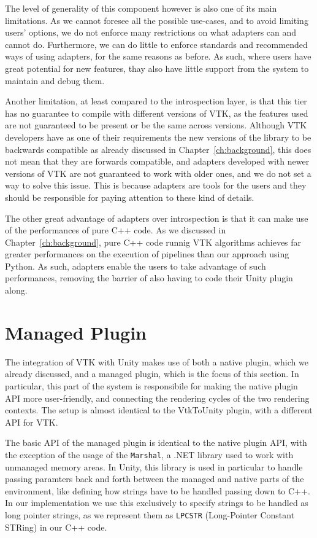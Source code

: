 The level of generality of this component however is also one of its main limitations. As we cannot foresee all the possible use-cases, and to avoid limiting users' options, we do not enforce many restrictions on what adapters can and cannot do. Furthermore, we can do little to enforce standards and recommended ways of using adapters, for the same reasons as before. As such, where users have great potential for new features, thay also have little support from the system to maintain and debug them.

Another limitation, at least compared to the introspection layer, is that this tier has no guarantee to compile with different versions of VTK, as the features used are not guaranteed to be present or be the same across versions. Although VTK developers have as one of their requirements the new versions of the library to be backwards compatible as already discussed in Chapter~\ref{ch:background}, this does not mean that they are forwards compatible, and adapters developed with newer versions of VTK are not guaranteed to work with older ones, and we do not set a way to solve this issue. This is because adapters are tools for the users and they should be responsible for paying attention to these kind of details.

The other great advantage of adapters over introspection is that it can make use of the performances of pure C++ code. As we discussed in Chapter~\ref{ch:background}, pure C++ code runnig VTK algorithms achieves far greater performances on the execution of pipelines than our approach using Python. As such, adapters enable the users to take advantage of such performances, removing the barrier of also having to code their Unity plugin along.

\section{Managed Plugin}
\label{sec:design-managed-plugin}

The integration of VTK with Unity makes use of both a native plugin, which we already discussed, and a managed plugin, which is the focus of this section. In particular, this part of the system is responsibile for making the native plugin API more user-friendly, and connecting the rendering cycles of the two rendering contexts. The setup is almost identical to the VtkToUnity plugin, with a different API for VTK.

The basic API of the managed plugin is identical to the native plugin API, with the exception of the usage of the \verb|Marshal|, a .NET library used to work with unmanaged memory areas. In Unity, this library is used in particular to handle passing paramters back and forth between the managed and native parts of the environment, like defining how strings have to be handled passing down to C++. In our implementation we use this exclusively to specify strings to be handled as long pointer strings, as we represent them as \verb|LPCSTR| (Long-Pointer Constant STRing) in our C++ code.

